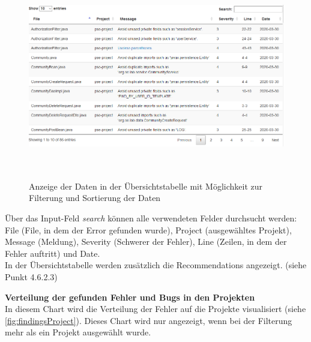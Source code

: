 \begin{figure}[tp]
  \centering
  \includegraphics[height=9cm]{images/pagination.PNG}
 \caption[Anzeige der Daten in der Übersichtstabelle mit Möglichkeit zur Filterung und Sortierung der Daten]{Anzeige der Daten in der Übersichtstabelle mit Möglichkeit zur Filterung und Sortierung der Daten}
  \label{fig:pagination}
\end{figure}

Über das Input-Feld \textit{search} können alle verwendeten Felder durchsucht werden: File (File, in dem der Error gefunden wurde), Project (ausgewähltes Projekt), Message (Meldung), Severity (Schwerer der Fehler), Line (Zeilen, in dem der Fehler auftritt) und Date. \\ In der Übersichtstabelle werden zusätzlich die Recommendations angezeigt. (siehe Punkt 4.6.2.3) 

\textbf{Verteilung der gefunden Fehler und Bugs in den Projekten} \\
In diesem Chart wird die Verteilung der Fehler auf die Projekte visualisiert (siehe \ref{fig:findingsProject}). Dieses Chart wird nur angezeigt, wenn bei der Filterung mehr als ein Projekt ausgewählt wurde. 


